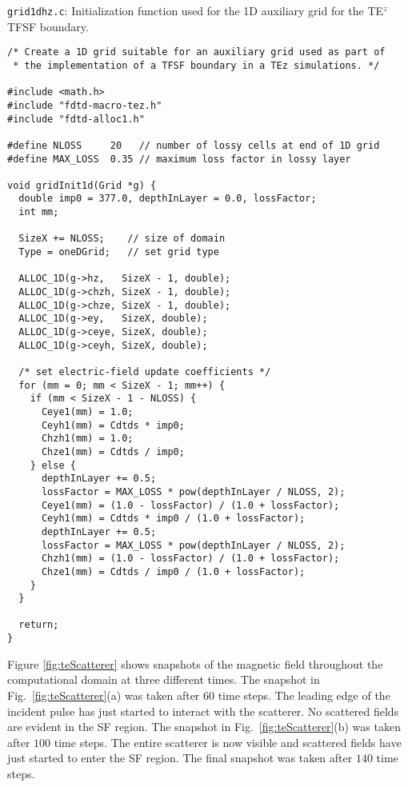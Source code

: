 \begin{program}
{\tt grid1dhz.c}:  Initialization function used for the 1D auxiliary
grid for the TE$^z$ TFSF boundary.
\label{pro:grid1dhz}
\codemiddle
\begin{lstlisting}
/* Create a 1D grid suitable for an auxiliary grid used as part of
 * the implementation of a TFSF boundary in a TEz simulations. */

#include <math.h>
#include "fdtd-macro-tez.h"
#include "fdtd-alloc1.h"

#define NLOSS     20   // number of lossy cells at end of 1D grid
#define MAX_LOSS  0.35 // maximum loss factor in lossy layer

void gridInit1d(Grid *g) {
  double imp0 = 377.0, depthInLayer = 0.0, lossFactor;
  int mm;

  SizeX += NLOSS;    // size of domain
  Type = oneDGrid;   // set grid type

  ALLOC_1D(g->hz,   SizeX - 1, double);
  ALLOC_1D(g->chzh, SizeX - 1, double);
  ALLOC_1D(g->chze, SizeX - 1, double);
  ALLOC_1D(g->ey,   SizeX, double);
  ALLOC_1D(g->ceye, SizeX, double);
  ALLOC_1D(g->ceyh, SizeX, double);
  
  /* set electric-field update coefficients */
  for (mm = 0; mm < SizeX - 1; mm++) {
    if (mm < SizeX - 1 - NLOSS) {
      Ceye1(mm) = 1.0;
      Ceyh1(mm) = Cdtds * imp0;
      Chzh1(mm) = 1.0;
      Chze1(mm) = Cdtds / imp0;
    } else {
      depthInLayer += 0.5;
      lossFactor = MAX_LOSS * pow(depthInLayer / NLOSS, 2);
      Ceye1(mm) = (1.0 - lossFactor) / (1.0 + lossFactor);
      Ceyh1(mm) = Cdtds * imp0 / (1.0 + lossFactor);
      depthInLayer += 0.5;
      lossFactor = MAX_LOSS * pow(depthInLayer / NLOSS, 2);
      Chzh1(mm) = (1.0 - lossFactor) / (1.0 + lossFactor);
      Chze1(mm) = Cdtds / imp0 / (1.0 + lossFactor);
    }
  }

  return;
}
\end{lstlisting}
\end{program}

Figure \ref{fig:teScatterer} shows snapshots of the magnetic field
throughout the computational domain at three different times.  The
snapshot in Fig.\ \ref{fig:teScatterer}(a) was taken after $60$ time
steps.  The leading edge of the incident pulse has just started to
interact with the scatterer.  No scattered fields are evident in the SF
region.  The snapshot in Fig.\ \ref{fig:teScatterer}(b) was taken
after $100$ time steps.  The entire scatterer is now visible and
scattered fields have just started to enter the SF region.  The final
snapshot was taken after $140$ time steps.

